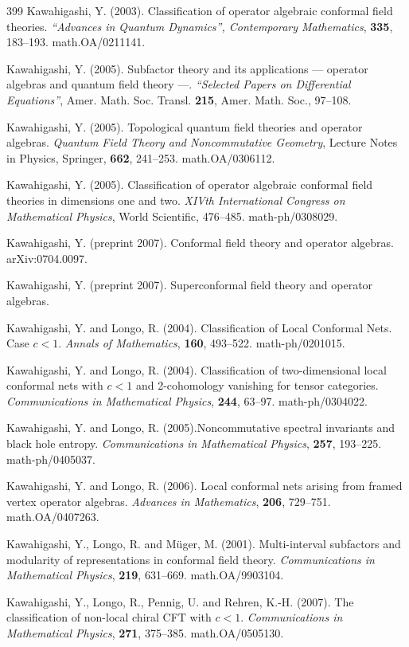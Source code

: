 \documentclass[12pt]{article}
\theoremstyle{plain}
\theoremstyle{definition}
\numberwithin{equation}{section}
\begin{document}
\begin{thebibliography} {399}
Kawahigashi, Y. (2003).
Classification of operator algebraic conformal field theories.
{\em ``Advances in Quantum Dynamics'', Contemporary Mathematics},
{\bf 335}, 183--193.
math.OA/0211141.

Kawahigashi, Y. (2005).
Subfactor theory and its applications
--- operator algebras and quantum field theory ---.
{\em ``Selected Papers on Differential Equations''},
Amer. Math. Soc. Transl. {\bf 215}, Amer. Math. Soc., 97--108.

Kawahigashi, Y. (2005). Topological quantum field theories and operator algebras.
{\em Quantum Field Theory and Noncommutative Geometry}, Lecture Notes in Physics, Springer, {\bf 662}, 241--253. math.OA/0306112.

Kawahigashi, Y. (2005). Classification of operator algebraic conformal field theories 
in dimensions one and two. {\em XIVth International Congress on Mathematical Physics}, 
World Scientific, 476--485. math-ph/0308029.

Kawahigashi, Y. (preprint 2007). Conformal field theory and operator algebras.
arXiv:0704.0097.

Kawahigashi, Y. (preprint 2007). Superconformal field theory and operator algebras.

Kawahigashi, Y. and Longo, R. (2004).
Classification of Local Conformal Nets. Case $c<1$.
{\em Annals of Mathematics}, {\bf 160}, 493--522.
math-ph/0201015.

Kawahigashi, Y. and Longo, R. (2004).
Classification of two-dimensional local conformal nets with $c<1$
and 2-cohomology vanishing for tensor categories.
{\em Communications in Mathematical Physics}, {\bf 244}, 63--97.
math-ph/0304022.

Kawahigashi, Y. and Longo, R. (2005).Noncommutative spectral invariants and black hole entropy.
{\em Communications in Mathematical Physics}, {\bf 257}, 193--225.
math-ph/0405037.

Kawahigashi, Y. and Longo, R. (2006).
Local conformal nets arising from framed vertex operator algebras.
{\em Advances in Mathematics}, {\bf 206}, 729--751. math.OA/0407263.

Kawahigashi, Y., Longo, R. and M\"uger, M. (2001).
Multi-interval subfactors and modularity of representations
in conformal field theory. {\em Communications in Mathematical Physics}, {\bf 219}, 631--669.
math.OA/9903104.

Kawahigashi, Y., Longo, R., Pennig, U. and Rehren, K.-H. (2007).
The classification of non-local chiral CFT with $c<1$.
{\em Communications in Mathematical Physics}, {\bf 271}, 375--385. math.OA/0505130.

\end{thebibliography}

\end{document}
